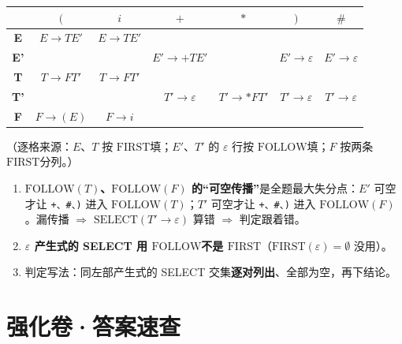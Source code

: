 \documentclass[12pt,a4paper,fontset=windows]{ctexart}
\newcommand{\FR}[1]{\ensuremath{\mathrm{FIRST}(#1)}}
\newcommand{\FO}[1]{\ensuremath{\mathrm{FOLLOW}(#1)}}
\newcommand{\FRname}{\ensuremath{\mathrm{FIRST}}}
\newcommand{\FOname}{\ensuremath{\mathrm{FOLLOW}}}
\newcommand{\imp}{\ensuremath{\Rightarrow}}
\begin{document}
\begin{center}
\renewcommand{\arraystretch}{1.3}
\begin{tabular}{c|cccccc}
\toprule
        & $($          & $i$       & $+$            & $*$             & $)$           & $\#$ \\
\midrule
\textbf{E}  & $E \to TE'$ & $E \to TE'$ &                &                 &               & \\
\textbf{E'} &             &             & $E' \to +TE'$  &                 & $E' \to \varepsilon$ & $E' \to \varepsilon$ \\
\textbf{T}  & $T \to FT'$ & $T \to FT'$ &                &                 &               & \\
\textbf{T'} &             &             & $T' \to \varepsilon$ & $T' \to *FT'$ & $T' \to \varepsilon$ & $T' \to \varepsilon$ \\
\textbf{F}  & $F \to (E)$ & $F \to i$   &                &                 &               & \\
\bottomrule
\end{tabular}
\end{center}

（逐格来源：$E$、$T$ 按 \FRname 填；$E'$、$T'$ 的 $\varepsilon$ 行按 \FOname 填；$F$ 按两条 \FRname 分列。）

\begin{warnbox}
\begin{enumerate}
\item \textbf{\FO{T}、\FO{F} 的``可空传播''}是全题最大失分点：$E'$ 可空才让 \texttt{+、\#、)} 进入 \FO{T}；$T'$ 可空才让 \texttt{+、\#、)} 进入 \FO{F}。漏传播 \imp{} $\mathrm{SELECT}(T' \to \varepsilon)$ 算错 \imp{} 判定跟着错。
\item \textbf{$\varepsilon$ 产生式的 SELECT 用 \FOname 不是 \FRname}（$\FR{\varepsilon} = \emptyset$ 没用）。
\item 判定写法：同左部产生式的 SELECT 交集\textbf{逐对列出}、全部为空，再下结论。
\end{enumerate}
\end{warnbox}

\section{强化卷·答案速查}
\end{document}
